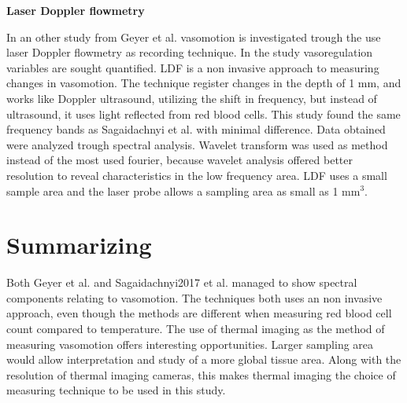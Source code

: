 \textbf{Laser Doppler flowmetry}

In an other study from Geyer et al. vasomotion is investigated trough the use laser Doppler flowmetry as recording technique. In the study vasoregulation variables are sought quantified. LDF is a non invasive approach to measuring changes in vasomotion. The technique register changes in the depth of 1 mm, and works like Doppler ultrasound, utilizing the shift in frequency, but instead of ultrasound, it uses light reflected from red blood cells. This study found the same frequency bands as Sagaidachnyi et al. with minimal difference. Data obtained were analyzed trough spectral analysis. Wavelet transform was used as method instead of the most used fourier, because wavelet analysis offered better resolution to reveal characteristics in the low frequency area.\cite{Geyer2004}
LDF uses a small sample area and the laser probe allows a sampling area as small as 1 mm$^3$.\cite{brothers2010} 

  
\section{Summarizing}

Both Geyer et al. and Sagaidachnyi2017 et al. managed to show spectral components relating to vasomotion. The techniques both uses an non invasive approach, even though the methods are different when measuring red blood cell count compared to temperature. The use of thermal imaging as the method of measuring vasomotion offers interesting opportunities. Larger sampling area would allow interpretation and study of a more global tissue area. Along with the resolution of thermal imaging cameras, this makes thermal imaging the choice of measuring technique to be used in this study. 


